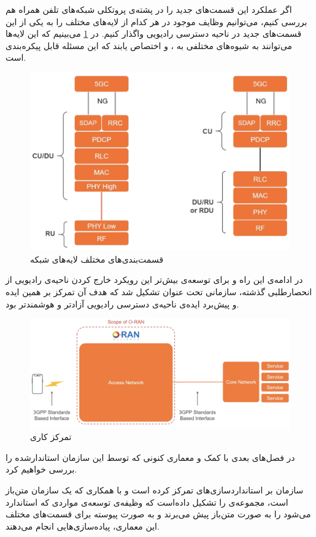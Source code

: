 اگر عملکرد این قسمت‌های جدید را در پشته‌ی پروتکلی شبکه‌های تلفن همراه هم بررسی کنیم، می‌توانیم وظایف موجود در هر کدام از لایه‌های مختلف را به یکی از این قسمت‌های جدید در ناحیه دسترسی رادیویی واگذار کنیم. در 
\ref{fig:prot-stack}
می‌بینیم که این لایه‌ها می‌توانند به شیوه‌های مختلفی به 
،
و 
اختصاص یابند که این مسئله قابل پیکره‌بندی است.

\begin{figure}[H]
	\includegraphics[width=0.85\columnwidth]{Picture/prot-stack.png}
	\centering
	\caption{قسمت‌بندی‌های مختلف لایه‌های شبکه‌}
	\label{fig:prot-stack}
\end{figure}

در ادامه‌ی این راه و برای توسعه‌ی بیش‌تر این رویکرد خارج کردن ناحیه‌ی رادیویی از انحصارطلبی گذشته، سازمانی تحت عنوان
تشکیل شد که هدف آن تمرکز بر همین ایده و پیش‌برد ایده‌ی ناحیه‌ی دسترسی رادیویی آزادتر و هوشمندتر بود.

\begin{figure}[H]
	\includegraphics[width=0.85\columnwidth]{Picture/alliance.png}
	\centering
	\caption{تمرکز کاری
	}
	\label{fig:alliance}
\end{figure}

در فصل‌های بعدی با کمک
\cite{oran2022-tutorial}
و
\cite{parallelwireless_2021}
 معماری کنونی 
که توسط این سازمان استاندارشده را بررسی خواهیم کرد.

\begin{note}
سازمان 
بر استانداردسازی‌های 
تمرکز کرده است و با همکاری
که یک سازمان متن‌باز است، مجموعه‌ی 
را تشکیل داده‌است که وظیفه‌ی توسعه‌ی مواردی که استاندارد می‌شود را به صورت متن‌باز پیش می‌برند و به صورت پیوسته برای قسمت‌های مختلف این معماری، پیاده‌سازی‌هایی انجام می‌دهند.
\end{note}







